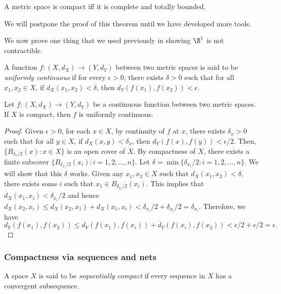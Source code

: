 \begin{theorem}\label{thm: complete and totally bounded}
    A metric space is compact iff it is complete and totally bounded.
\end{theorem}

We will postpone the proof of this theorem until we have developed more tools.

We now prove one thing that we used previously in showing $\S^1$ is not contractible.

\begin{definition}
    A function $f:(X,d_X)\to (Y,d_Y)$ between two metric spaces is said to be \emph{uniformly continuous} if for every $\epsilon>0$, there exists $\delta>0$ such that for all $x_1,x_2\in X$, if $d_X(x_1,x_2)<\delta$, then $d_Y(f(x_1),f(x_2))<\epsilon$.
\end{definition}
\begin{theorem}
    Let $f:(X,d_X)\to (Y,d_Y)$ be a continuous function between two metric spaces. If $X$ is compact, then $f$ is uniformly continuous.
\end{theorem}
\begin{proof}
    Given $\epsilon>0$, for each $x\in X$, by continuity of $f$ at $x$, there exists $\delta_x>0$ such that for all $y\in X$, if $d_X(x,y)<\delta_x$, then $d_Y(f(x),f(y))<\epsilon/2$. Then, $\{B_{\delta_x/2}(x):x\in X\}$ is an open cover of $X$. By compactness of $X$, there exists a finite subcover $\{B_{\delta_{x_i}/2}(x_i):i=1,2,\ldots,n\}$. Let $\delta=\min\{\delta_{x_i}/2:i=1,2,\ldots,n\}$. We will show that this $\delta$ works. Given any $x_1,x_2\in X$ such that $d_X(x_1,x_2)<\delta$, there exists some $i$ such that $x_1\in B_{\delta_{x_i}/2}(x_i)$. This implies that $d_X(x_1,x_i)<\delta_{x_i}/2$ and hence $d_X(x_2,x_i)\le d_X(x_2,x_1)+d_X(x_1,x_i)<\delta_{x_i}/2+\delta_{x_i}/2=\delta_{x_i}$. Therefore, we have 
    \[d_Y(f(x_1),f(x_2))\le d_Y(f(x_1),f(x_i))+d_Y(f(x_i),f(x_2))<\epsilon/2+\epsilon/2=\epsilon.\]

\end{proof}

\subsubsection{Compactness via sequences and nets}

\begin{definition}
A space $X$ is said to be \emph{sequentially compact} if every sequence in $X$ has a convergent subsequence.
\end{definition}


